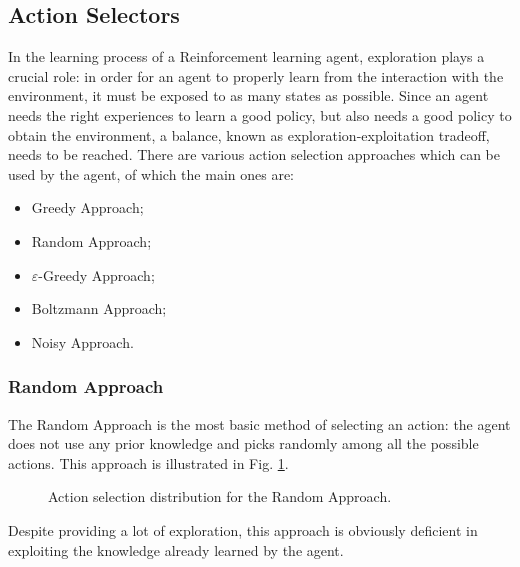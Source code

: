 \documentclass[a4paper, 12pt]{article}
\numberwithin{equation}{section}
\begin{document}
\subsection[Action Selectors]{Action Selectors \cite{action-selectors}}\label{sec:action-selectors}
In the learning process of a Reinforcement learning agent, exploration plays a crucial role: in order for an agent to properly learn from the interaction with the environment, it must be exposed to as many states as possible. Since an agent needs the right experiences to learn a good policy, but also needs a good policy to obtain the environment, a balance, known as exploration-exploitation tradeoff, needs to be reached. There are various action selection approaches which can be used by the agent, of which the main ones are:
\begin{itemize}
	\item Greedy Approach;
	\item Random Approach;
	\item $\varepsilon$-Greedy Approach;
	\item Boltzmann Approach;
	\item Noisy Approach.
\end{itemize}


\subsubsection{Random Approach}

The Random Approach is the most basic method of selecting an action: the agent does not use any prior knowledge and picks randomly among all the possible actions. This approach is illustrated in Fig. \ref{fig:random}.

\begin{figure}[h]
	\centering
		\caption{Action selection distribution for the Random Approach.}
	\label{fig:random}
\end{figure}

Despite providing a lot of exploration, this approach is obviously deficient in exploiting the knowledge already learned by the agent.
\end{document}

